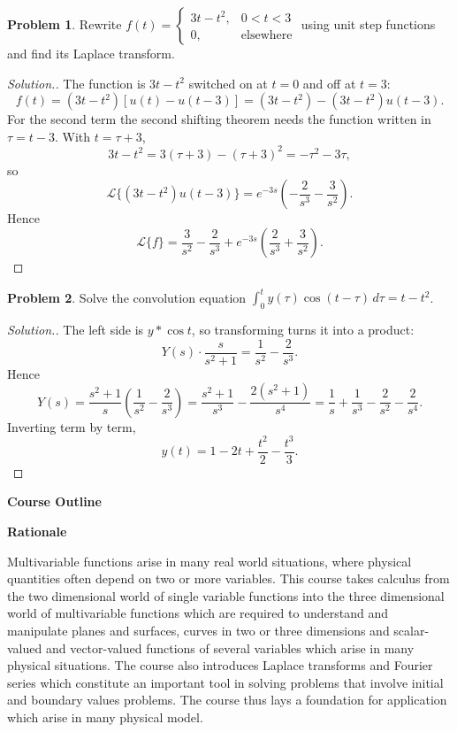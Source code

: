 \documentclass[11pt,a4paper]{article}
\theoremstyle{definition}
\newtheorem{problemx}{Problem}[subsection]
\newenvironment{problem}{\begin{problemx}}{\end{problemx}}
\newenvironment{solution}
  {\renewcommand{\qedsymbol}{}\begin{proof}[\textit{Solution}.]}
  {\end{proof}}
\newcommand{\subhead}[1]{%
  \par\medskip\noindent\textbf{#1}\par\nobreak\smallskip}
\begin{document}
\begin{problem}
Rewrite
$f(t) = \begin{cases}3t-t^2, & 0<t<3\\ 0, & \text{elsewhere}\end{cases}$
using unit step functions and find its Laplace transform.
\end{problem}
\begin{solution}
The function is $3t-t^2$ switched on at $t=0$ and off at $t=3$:
\[f(t) = (3t-t^2)[u(t)-u(t-3)]
= (3t-t^2) - (3t-t^2)u(t-3).\]
For the second term the second shifting theorem needs the function written in
$\tau = t-3$. With $t = \tau+3$,
\[3t-t^2 = 3(\tau+3)-(\tau+3)^2 = -\tau^2-3\tau ,\]
so
\[\mathcal{L}\{(3t-t^2)u(t-3)\}
= e^{-3s}\left(-\frac{2}{s^3} - \frac{3}{s^2}\right).\]
Hence
\[\mathcal{L}\{f\} = \frac{3}{s^2} - \frac{2}{s^3}
+ e^{-3s}\left(\frac{2}{s^3} + \frac{3}{s^2}\right).\]
\end{solution}

\begin{problem}
Solve the convolution equation
$\displaystyle{\int_0^t y(\tau)\cos(t-\tau)\,d\tau = t-t^2}$.
\end{problem}
\begin{solution}
The left side is $y * \cos t$, so transforming turns it into a product:
\[Y(s)\cdot\frac{s}{s^2+1} = \frac{1}{s^2} - \frac{2}{s^3}.\]
Hence
\[Y(s) = \frac{s^2+1}{s}\left(\frac{1}{s^2}-\frac{2}{s^3}\right)
= \frac{s^2+1}{s^3} - \frac{2(s^2+1)}{s^4}
= \frac1s + \frac{1}{s^3} - \frac{2}{s^2} - \frac{2}{s^4}.\]
Inverting term by term,
\[y(t) = 1 - 2t + \frac{t^2}{2} - \frac{t^3}{3}.\]
\end{solution}



\pagebreak

\newpage
\thispagestyle{empty}
\subhead{Course Outline}


\textbf{Rationale}


Multivariable functions arise in many real world situations, where physical quantities often depend on two or more variables. This course takes calculus from the two dimensional world of single variable functions into the three dimensional world of multivariable functions which are required to understand and manipulate planes and surfaces, curves in two or three dimensions and scalar-valued and vector-valued functions of several variables which arise in many physical situations. The course also introduces Laplace transforms and Fourier series which constitute an important tool in solving problems that involve initial and boundary values problems. The course thus lays a foundation for application which arise in many physical model.
\end{document}
